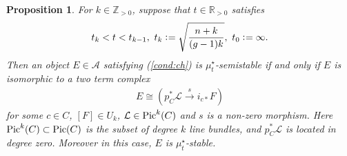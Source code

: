 \documentclass[11pt]{amsart}
\theoremstyle{plain}
\newtheorem{prop}[thm]{Proposition}
\newcommand{\aA}{\mathcal{A}}
\newcommand{\lL}{\mathcal{L}}
\newcommand{\Pic}{\mathop{\rm Pic}\nolimits}
\begin{document}
\begin{prop}\label{prop:wall}
For $k \in \mathbb{Z}_{>0}$, suppose that 
$t \in \mathbb{R}_{>0}$ satisfies
\begin{align}\label{t:ineq}
t_k < t < t_{k-1}, \ t_k \cneq \sqrt{\frac{n+k}{(g-1)k}}, \ 
t_0 \cneq \infty. 
\end{align}
Then an object $E \in \aA$ 
satisfying (\ref{cond:ch})
is $\mu_t^{\star}$-semistable 
if and only if 
$E$ is isomorphic to a two term complex
\begin{align}\label{twoterm}
E \cong (p_C^{\ast}\lL \stackrel{s}{\to} i_{c\ast}F)
\end{align}
for some $c \in C$, 
$[F] \in U_k$, 
$\lL \in \Pic^k(C)$ and 
$s$ is a non-zero morphism. 
Here 
$\Pic^k(C) \subset \Pic(C)$
is the subset of degree $k$ line bundles, and 
$p_C^{\ast}\lL$ is located in degree zero.
Moreover in this case, $E$ is 
$\mu_t^{\star}$-stable. 
\end{prop}
\end{document}
